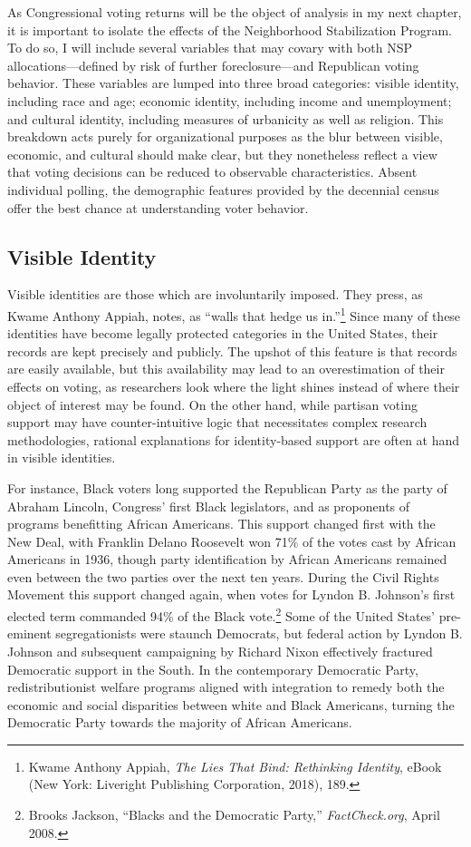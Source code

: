 \documentclass[12pt,oneside]{psthesis}
\begin{document}
As Congressional voting returns will be the object of analysis in my next chapter, it is important to isolate the effects of the Neighborhood Stabilization Program.
To do so, I will include several variables that may covary with both NSP allocations---defined by risk of further foreclosure---and Republican voting behavior.
These variables are lumped into three broad categories: visible identity, including race and age; economic identity, including income and unemployment; and cultural identity, including measures of urbanicity as well as religion.
This breakdown acts purely for organizational purposes as the blur between visible, economic, and cultural should make clear, but they nonetheless reflect a view that voting decisions can be reduced to observable characteristics.
Absent individual polling, the demographic features provided by the decennial census offer the best chance at understanding voter behavior.

\hypertarget{visible-identity}{%
\subsection{Visible Identity}\label{visible-identity}}

Visible identities are those which are involuntarily imposed.
They press, as Kwame Anthony Appiah, notes, as ``walls that hedge us in.''\footnote{Kwame Anthony Appiah, \emph{The Lies That Bind: Rethinking Identity}, eBook (New York: Liveright Publishing Corporation, 2018), 189.}
Since many of these identities have become legally protected categories in the United States, their records are kept precisely and publicly.
The upshot of this feature is that records are easily available, but this availability may lead to an overestimation of their effects on voting, as researchers look where the light shines instead of where their object of interest may be found.
On the other hand, while partisan voting support may have counter-intuitive logic that necessitates complex research methodologies, rational explanations for identity-based support are often at hand in visible identities.

For instance, Black voters long supported the Republican Party as the party of Abraham Lincoln, Congress' first Black legislators, and as proponents of programs benefitting African Americans.
This support changed first with the New Deal, with Franklin Delano Roosevelt won 71\% of the votes cast by African Americans in 1936, though party identification by African Americans remained even between the two parties over the next ten years.
During the Civil Rights Movement this support changed again, when votes for Lyndon B. Johnson's first elected term commanded 94\% of the Black vote.\footnote{Brooks Jackson, ``Blacks and the Democratic Party,'' \emph{FactCheck.org}, April 2008.}
Some of the United States' pre-eminent segregationists were staunch Democrats, but federal action by Lyndon B. Johnson and subsequent campaigning by Richard Nixon effectively fractured Democratic support in the South.
In the contemporary Democratic Party, redistributionist welfare programs aligned with integration to remedy both the economic and social disparities between white and Black Americans, turning the Democratic Party towards the majority of African Americans.
\end{document}
